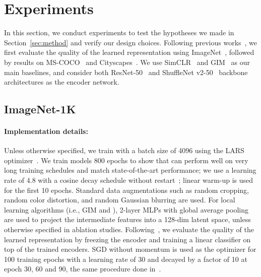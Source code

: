 \section{Experiments}
\label{sec:exp}

In this section, we conduct experiments to test the  hypotheses we made in Section~\ref{sec:method}
and verify our design choices. Following previous works~\cite{colorization, cpc,
bachman2019learning, kolesnikov2019revisiting, moco}, we first evaluate the quality of the learned
representation using ImageNet~\cite{deng2009imagenet}, followed by results on MS-COCO~\cite{mscoco}
and Cityscapes~\cite{cityscapes}. We use SimCLR~\cite{simclr} and GIM~\cite{e2e2e} as our main
baselines, and  consider both ResNet-50~\cite{he2016deep} and ShuffleNet
v2-50~\cite{ma2018shufflenet} backbone architectures as the encoder network.

\subsection{ImageNet-1K} 
\paragraph{Implementation details:} Unless otherwise specified, we train with a batch size of 4096
using the LARS optimizer~\cite{you2017large}. We train models 800 epochs to show that \ours{} can
perform well on very long training schedules and match state-of-the-art performance; we use a
learning rate of 4.8 with a cosine decay schedule without restart~\cite{loshchilov2016sgdr}; linear
warm-up is used for the first 10 epochs. Standard data augmentations such as random cropping, random
color distortion, and random Gaussian blurring are used. For local learning algorithms (i.e., GIM 
and {\ours}), 2-layer MLPs with global average pooling are used to project the intermediate features
into a 128-dim latent space, unless otherwise specified in ablation studies.
Following~\cite{colorization, cpc, bachman2019learning, kolesnikov2019revisiting, moco}, we evaluate
the quality of the learned representation by freezing the encoder and training a linear classifier
on top of the trained encoders. SGD without momentum is used as the optimizer for 100 training
epochs with a learning rate of 30 and decayed by a factor of 10 at epoch 30, 60 and 90, the same
procedure done in~\cite{moco}.

